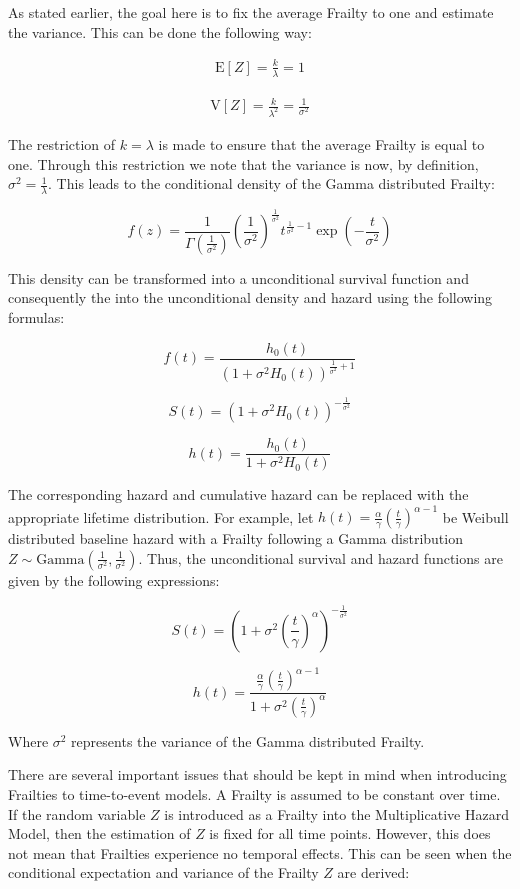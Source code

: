 As stated earlier, the goal here is to fix the average Frailty to one and estimate the variance. This can be done the following way:

\begin{align*}
\mathrm{E}[Z] = \frac{k}{\lambda} = 1 \tag{$ k = \lambda $}
\end{align*}


\begin{align*}
\mathrm{V}[Z] = \frac{k}{\lambda^2} = \frac{1}{\sigma^2} \tag{$ k = \lambda $}
\end{align*}


The restriction of $k = \lambda$ is made to ensure that the average Frailty is equal to one. Through this restriction we note that the variance is now, by definition, $\sigma^2 = \frac{1}{\lambda}$. This leads to the conditional density of the Gamma distributed Frailty:

$$ f(z) = \frac{1}{\Gamma(\frac{1}{\sigma^2})} \left (\frac{1}{\sigma^2}  \right )^{\frac{1}{\sigma^2}} t^{\frac{1}{\sigma^2} - 1} \exp(-\frac{t}{\sigma^2}) $$

This density can be transformed into a unconditional survival function and consequently the into the unconditional density and hazard using the following formulas:

$$ f(t) = \frac{h_0(t)}{(1+ \sigma^2 H_0(t))^{\frac{1}{\sigma^2}+ 1 } }$$

$$ S(t) = (1 + \sigma^2 H_0(t))^{- \frac{1}{\sigma^2}}$$

$$ h(t) = \frac{h_0(t)}{1 + \sigma^2 H_0(t)} $$


The corresponding hazard and cumulative hazard can be replaced with the appropriate lifetime distribution. For example, let $h(t) =  \frac{\alpha}{\gamma} \left (\frac{t}{\gamma}  \right )^{\alpha - 1}$ be Weibull distributed baseline hazard with a Frailty following a Gamma distribution $Z \sim \text{Gamma}(\frac{1}{\sigma^2}, \frac{1}{\sigma^2} )$. Thus, the unconditional survival and hazard functions are given by the following expressions:

$$ S(t) = \left (1 + \sigma^2 \left (\frac{t}{\gamma}  \right )^{\alpha}  \right )^{-\frac{1}{\sigma^2}} $$

$$ h(t) = \frac{\frac{\alpha}{\gamma}\left (\frac{t}{\gamma}  \right )^{\alpha - 1}}{1 + \sigma^2 \left (\frac{t}{\gamma}  \right )^{\alpha} } $$

Where $\sigma^2$ represents the variance of the Gamma distributed Frailty.

There are several important issues that should be kept in mind when introducing Frailties to time-to-event models. A Frailty is assumed to be constant over time. If the random variable $Z$ is introduced as a Frailty into the Multiplicative Hazard Model, then the estimation of $Z$ is fixed for all time points. However, this does not mean that Frailties experience no temporal effects. This can be seen when the conditional expectation and variance of the Frailty $Z$ are derived:

